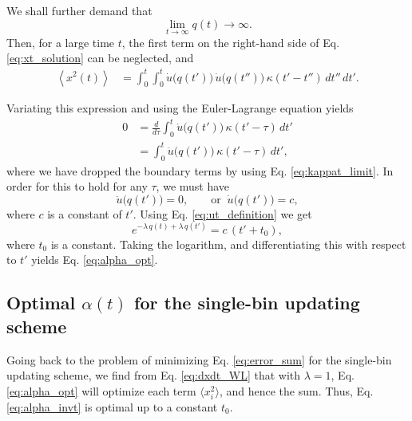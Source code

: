 \documentclass[reprint]{revtex4-1}
\begin{document}
We shall further demand that
%
\begin{equation}
  \lim_{t \to \infty} q(t) \to \infty.
  \label{eq:qt_limit}
\end{equation}
%
Then, for a large time $t$,
the first term on the right-hand side
of Eq. \eqref{eq:xt_solution} can be neglected, and
%
\begin{align}
\left\langle x^2(t) \right\rangle
&=
\int_0^t \int_0^t
  \dot u\bigl( q(t') \bigr) \,
  \dot u\bigl( q(t'') \bigr) \,
  \kappa(t' - t'') \, dt'' \, dt'.
\label{eq:x2t_average}
\end{align}



Variating this expression and
using the Euler-Lagrange equation yields
$$
\begin{aligned}
0
&=
\frac{d}{d\tau} \int_0^t
  \dot u\bigl( q(t') \bigr) \, \kappa(t' - \tau) \, dt'
\\
&= \int_0^t
  \ddot u\bigl( q(t') \bigr) \, \kappa(t' - \tau) \, dt',
\end{aligned}
$$
where we have dropped the boundary terms
by using Eq. \eqref{eq:kappat_limit}.
%
%
In order for this to hold for any $\tau$,
we must have
%
\begin{equation}
\ddot u\bigl( q(t') \bigr) = 0,
\qquad
\mathrm{or}
\;\;
\dot u\bigl( q(t') \bigr) = c,
\label{eq:ddu_eq_0}
\end{equation}
%
where $c$ is a constant of $t'$.
%
Using Eq. \eqref{eq:ut_definition}
we get
$$
e^{-\lambda \, q(t) + \lambda \, q(t')}
=
c \, (t' + t_0),
$$
where $t_0$ is a constant.
%
Taking the logarithm, and differentiating this with respect to $t'$
yields Eq. \eqref{eq:alpha_opt}.



\subsection{Optimal $\alpha(t)$ for the single-bin updating scheme}



Going back to the problem of
minimizing Eq. \eqref{eq:error_sum}
for the single-bin updating scheme,
we find from Eq. \eqref{eq:dxdt_WL}
that with $\lambda = 1$,
Eq. \eqref{eq:alpha_opt}
will optimize each term $\langle x_i^2 \rangle$,
and hence the sum.
%
Thus, Eq. \eqref{eq:alpha_invt} is optimal
up to a constant $t_0$. %
\end{document}
